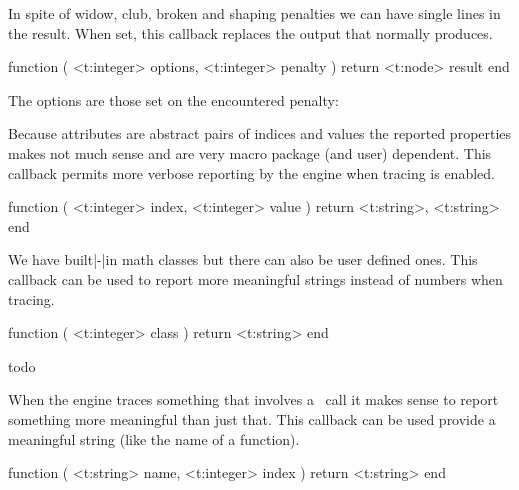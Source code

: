 \stopsubsection

\startsubsection[title=show_loners]

In spite of widow, club, broken and shaping penalties we can have single lines in the
result. When set, this callback replaces the output that normally \typ {\tracingloners}
produces.

\starttyping[option=LUA]
function (
    <t:integer> options,
    <t:integer> penalty
)
    return <t:node> result
end
\stoptyping

The options are those set on the encountered penalty:

\startthreerows
{}
\stopthreerows

\stopsubsection

\startsubsection[title=get_attribute]

Because attributes are abstract pairs of indices and values the reported
properties makes not much sense and are very macro package (and user) dependent.
This callback permits more verbose reporting by the engine when tracing is
enabled.

\starttyping[option=LUA]
function (
    <t:integer> index,
    <t:integer> value
)
    return <t:string>, <t:string>
end
\stoptyping

\stopsubsection

\startsubsection[title=get_noad_class]

We have built|-|in math classes but there can also be user defined ones. This
callback can be used to report more meaningful strings instead of numbers when
tracing.

\starttyping[option=LUA]
function (
    <t:integer> class
)
    return <t:string>
end
\stoptyping


\stopsubsection

\startsubsection[title=get_math_dictionary]
    todo
\stopsubsection

\startsubsection[title=show_lua_call]

When the engine traces something that involves a \LUA\ call it makes sense to report something
more meaningful than just that. This callback can be used provide a meaningful string (like the
name of a function).

\starttyping[option=LUA]
function (
    <t:string>  name,
    <t:integer> index
)
    return <t:string>
end
\stoptyping

\stopsubsection

\startsubsection[title=trace_memory]

